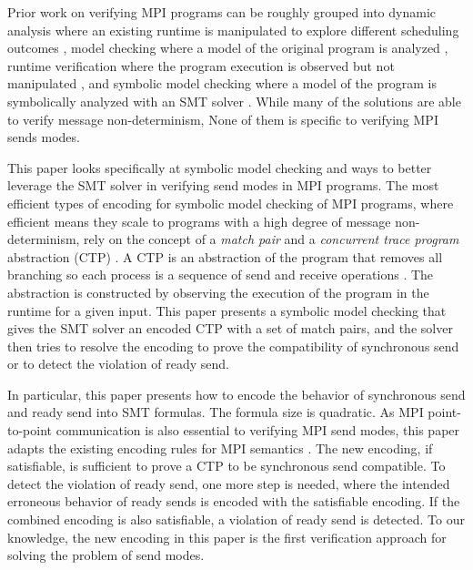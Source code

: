 Prior work on verifying MPI programs can be roughly grouped into dynamic analysis where an existing runtime is manipulated to explore different scheduling outcomes \cite{DBLP:conf/ppopp/VakkalankaSGK08,DBLP:conf/sbmf/SharmaGB12}, model checking where a model of the original program is analyzed \cite{DBLP:conf/vmcai/Siegel07,DBLP:conf/pvm/Siegel07}, runtime verification where the program execution is observed but not manipulated \cite{DBLP:conf/sc/VetterS00,DBLP:conf/parco/KrammerBMR03,DBLP:conf/ptw/HilbrichSSM09}, and symbolic model checking where a model of the program is symbolically analyzed with an SMT solver \cite{DBLP:conf/kbse/HuangMM13,HuangNFM15}. While many of the solutions are able to verify message non-determinism, None of them is specific to verifying MPI sends modes.


This paper looks specifically at symbolic model checking and ways to better leverage the SMT solver in verifying send modes in MPI programs. 
The most efficient types of encoding for symbolic model checking of MPI programs, where efficient means they scale to programs with a high degree of message non-determinism, rely on the concept of a \emph{match pair} and a \emph{concurrent trace program} abstraction (CTP) \cite{DBLP:conf/kbse/HuangMM13,HuangNFM15,DBLP:conf/fm/ForejtKNS14,DBLP:conf/atva/ElwakilYW10,DBLP:conf/issta/ElwakilY10}. 
A CTP is an abstraction of the program that removes all branching so each process is a sequence of send and receive operations \cite{DBLP:conf/kbse/HuangMM13,HuangNFM15}. 
The abstraction is constructed by observing the execution of the program in the runtime for a given input. 
This paper presents a symbolic model checking that gives the SMT solver an encoded CTP with a set of match pairs, and the solver then tries to resolve the encoding to prove the compatibility of synchronous send or to detect the violation of ready send. 

In particular, this paper presents how to encode the behavior of synchronous send and ready send into SMT formulas. The formula size is quadratic. 
As MPI point-to-point communication is also essential to verifying MPI send modes, this paper adapts the existing encoding rules for MPI semantics \cite{HuangNFM15}. 
The new encoding, if satisfiable, is sufficient to prove a CTP to be synchronous send compatible. To detect the violation of ready send, one more step is needed, where the intended erroneous  behavior of ready sends is encoded with the satisfiable encoding. If the combined encoding is also satisfiable, a violation of ready send is detected. To our knowledge, the new encoding in this paper is the first verification approach for solving the problem of send modes.

